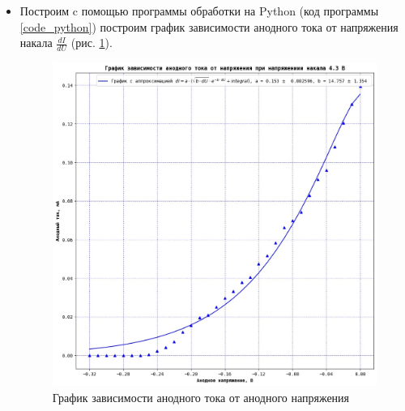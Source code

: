 \begin{itemize}
    \item Построим c помощью программы обработки на Python (код программы \ref{code_python})
    построим график зависимости анодного тока от напряжения накала $\frac{dI}{dU}$  (рис. \ref{fig:graph_toka}).

    \begin{figure}[h!p]
    \centering
    \includegraphics[scale=0.8]{ВАХ.jpg}
    \caption{График зависимости анодного тока от анодного напряжения}
    \label{fig:graph_toka}
    \end{figure}

    \newpage


\end{itemize}

